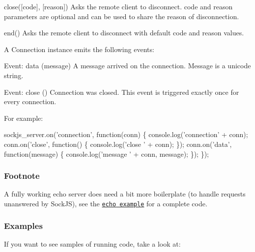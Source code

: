 \begin{DoxyDescription}
\item[close(\mbox{[}code\mbox{]}, \mbox{[}reason\mbox{]}) ]Asks the remote client to disconnect. \textquotesingle{}code\textquotesingle{} and \textquotesingle{}reason\textquotesingle{} parameters are optional and can be used to share the reason of disconnection.


\item[end() ]Asks the remote client to disconnect with default \textquotesingle{}code\textquotesingle{} and \textquotesingle{}reason\textquotesingle{} values.


\end{DoxyDescription}

A {\ttfamily Connection} instance emits the following events\+:


\begin{DoxyDescription}
\item[Event\+: data (message) ]A message arrived on the connection. Message is a unicode string.


\item[Event\+: close () ]Connection was closed. This event is triggered exactly once for every connection. 
\end{DoxyDescription}

For example\+:


\begin{DoxyCode}
sockjs\_server.on('connection', function(conn) \{
    console.log('connection' + conn);
    conn.on('close', function() \{
        console.log('close ' + conn);
    \});
    conn.on('data', function(message) \{
        console.log('message ' + conn,
                    message);
    \});
\});
\end{DoxyCode}


\subsubsection*{Footnote}

A fully working echo server does need a bit more boilerplate (to handle requests unanswered by Sock\+JS), see the \href{https://github.com/sockjs/sockjs-node/tree/master/examples/echo}{\tt {\ttfamily echo} example} for a complete code.

\subsubsection*{Examples}

If you want to see samples of running code, take a look at\+:



